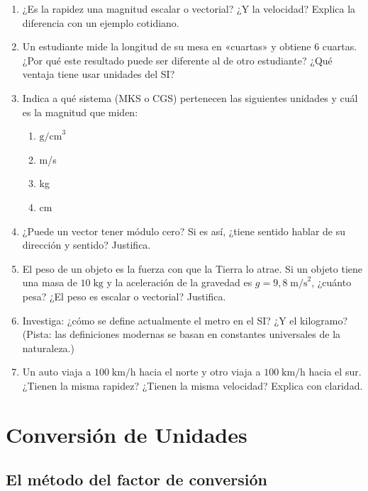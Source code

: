 \documentclass[12pt, a4paper]{article}
\begin{document}
\begin{enumerate}[leftmargin=*]
  \item \medio{} ¿Es la rapidez una magnitud escalar o vectorial? ¿Y la velocidad? Explica la diferencia con un ejemplo cotidiano.

  \item \medio{} Un estudiante mide la longitud de su mesa en «cuartas» y obtiene 6 cuartas. ¿Por qué este resultado puede ser diferente al de otro estudiante? ¿Qué ventaja tiene usar unidades del SI?

  \item \medio{} Indica a qué sistema (MKS o CGS) pertenecen las siguientes unidades y cuál es la magnitud que miden:
  \begin{enumerate}[label=\alph*)]
    \item $\text{g/cm}^3$
    \item m/s
    \item kg
    \item cm
  \end{enumerate}

  \item \dificil{} ¿Puede un vector tener módulo cero? Si es así, ¿tiene sentido hablar de su dirección y sentido? Justifica.

  \item \dificil{} El peso de un objeto es la fuerza con que la Tierra lo atrae. Si un objeto tiene una masa de $10\;\text{kg}$ y la aceleración de la gravedad es $g = 9{,}8\;\text{m/s}^2$, ¿cuánto pesa? ¿El peso es escalar o vectorial? Justifica.

  \item \dificil{} Investiga: ¿cómo se define actualmente el metro en el SI? ¿Y el kilogramo? (Pista: las definiciones modernas se basan en constantes universales de la naturaleza.)

  \item \dificil{} Un auto viaja a $100\;\text{km/h}$ hacia el norte y otro viaja a $100\;\text{km/h}$ hacia el sur. ¿Tienen la misma rapidez? ¿Tienen la misma velocidad? Explica con claridad.
\end{enumerate}

\newpage

\section{Conversión de Unidades}

\subsection{El método del factor de conversión}
\end{document}
